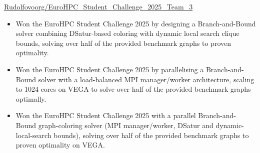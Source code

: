  {}
{
}
{\href{https://github.com/Rudolfovoorg/EuroHPC_Student_Challenge_2025_Team_3}{Rudolfovoorg/EuroHPC\_Student\_Challenge\_2025\_Team\_3}}
\begin{itemize}

    \ifde
        \item Won the EuroHPC Student Challenge 2025 by designing a Branch-and-Bound solver combining DSatur-based coloring with dynamic local search clique bounds, solving over half of the provided benchmark graphs to proven optimality.
    \else
        \ifhpc
            \item Won the EuroHPC Student Challenge 2025 by parallelising a Branch-and-Bound solver with a load-balanced MPI manager/worker architecture, scaling to 1024 cores on VEGA to solve over half of the provided benchmark graphs optimally.
        \else
            \item Won the EuroHPC Student Challenge 2025 with a parallel Branch-and-Bound graph-coloring solver (MPI manager/worker, DSatur and dynamic-local-search bounds), solving over half of the provided benchmark graphs to proven optimality on VEGA.
        \fi
    \fi

\end{itemize}

\medskip
